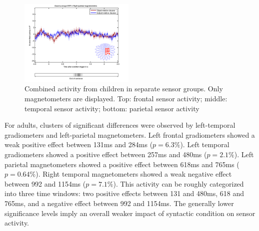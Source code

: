 \begin{figure}[h]
\begin{center}
\includegraphics[width=0.49\textwidth]{pics/children_Right-parietal-magnetometers.png}
\caption{\label{4.2.activity.kids} Combined activity from children in separate sensor groups. Only magnetometers are displayed. Top: frontal sensor activity; middle: temporal sensor activity; bottom: parietal sensor activity}
\end{center}
\end{figure}

For adults, clusters of significant differences were observed by left-temporal gradiometers and left-parietal magnetometers.
Left frontal gradiometers showed a weak positive effect between 131ms and 284ms ($p = 6.3\%$).
Left temporal gradiometers showed a positive effect between 257ms and 480ms ($p = 2.1\%$).
Left parietal magnetometers showed a positive effect between 618ms and 765ms ($p = 0.64\%$).
Right temporal magnetometers showed a weak negative effect between 992 and 1154ms ($p = 7.1\%$).
This activity can be roughly categorized into three time windows: two positive effects between 131 and 480ms, 618 and 765ms, and a negative effect between 992 and 1154ms.
The generally lower significance levels imply an overall weaker impact of syntactic condition on sensor activity.


